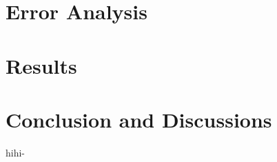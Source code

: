 \documentclass{article}
\begin{document}
\begin{multicols}{2}
\section{\label{error}Error Analysis}

\section{\label{results}Results}

\section{\label{Conclusion}Conclusion and Discussions}

hihi-\cite{ROOT}

\end{multicols}


\end{document}

